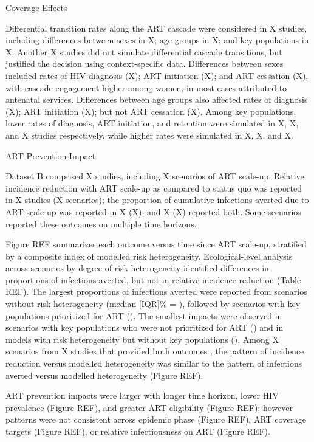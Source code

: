 Coverage Effects

Differential transition rates along the ART cascade were considered in
X studies, including differences between
sexes in X;
age groups in X; and
key populations in X.
Another X studies did not simulate differential cascade transitions,
but justified the decision using context-specific data.
Differences between sexes included rates of
HIV diagnosis (X);
ART initiation (X); and
ART cessation (X),
with cascade engagement higher among women,
in most cases attributed to antenatal services.
Differences between age groups also affected
rates of diagnosis (X);
ART initiation (X);
but not ART cessation (X). 
Among key populations, lower rates of
diagnosis, ART initiation, and retention were simulated in
X, X, and X
studies respectively, while higher rates were simulated in
X, X, and X.

ART Prevention Impact

Dataset B comprised X studies,
including X scenarios of ART scale-up.
Relative incidence reduction with ART scale-up
as compared to status quo
was reported in X studies (X scenarios);
the proportion of cumulative infections averted due to ART scale-up
was reported in X (X);
and X (X) reported both.
Some scenarios reported these outcomes on multiple time horizons.

Figure REF summarizes each outcome versus time since ART scale-up,
stratified by a composite index of modelled risk heterogeneity.
Ecological-level analysis across scenarios by degree of risk heterogeneity
identified differences in proportions of infections averted,
but not in relative incidence reduction (Table REF).
The largest proportions of infections averted were reported from
scenarios without risk heterogeneity (median [IQR]\% = ), followed by
scenarios with key populations prioritized for ART ().
The smallest impacts were observed in scenarios with
key populations who were not prioritized for ART ()
and in models with risk heterogeneity but without key populations
().
Among X scenarios from X studies that provided both outcomes
\cite{Salomon2005,Abbas2006,Pretorius2010,Nichols2014,Barnighausen2016,Maheu-Giroux2017,Akudibillah2018}, 
the pattern of incidence reduction versus modelled heterogeneity
was similar to the pattern of infections averted versus modelled heterogeneity
(Figure REF).

ART prevention impacts were larger with
longer time horizon,
lower HIV prevalence (Figure REF), and
greater ART eligibility (Figure REF);
however patterns were not consistent across
epidemic phase (Figure REF),
ART coverage targets (Figure REF), or
relative infectiousness on ART (Figure REF).

